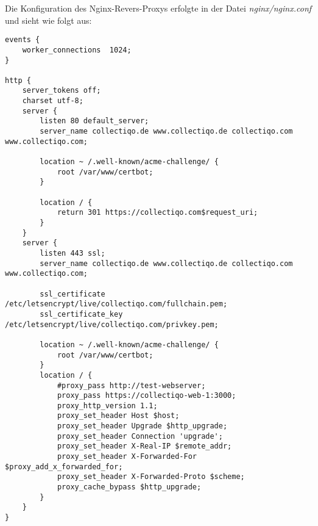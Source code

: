 Die Konfiguration des Nginx-Revers-Proxys erfolgte in der Datei \textit{nginx/nginx.conf} und sieht wie folgt aus:
\vspace{1em}
\begin{lstlisting}[label={lst:lst-nginx-config}]
events {
    worker_connections  1024;
}

http {
    server_tokens off;
    charset utf-8;
    server {
        listen 80 default_server;
        server_name collectiqo.de www.collectiqo.de collectiqo.com www.collectiqo.com;

        location ~ /.well-known/acme-challenge/ {
            root /var/www/certbot;
        }

        location / {
            return 301 https://collectiqo.com$request_uri;
        }
    }
    server {
        listen 443 ssl;
        server_name collectiqo.de www.collectiqo.de collectiqo.com www.collectiqo.com;

        ssl_certificate /etc/letsencrypt/live/collectiqo.com/fullchain.pem;
        ssl_certificate_key /etc/letsencrypt/live/collectiqo.com/privkey.pem;

        location ~ /.well-known/acme-challenge/ {
            root /var/www/certbot;
        }
        location / {
            #proxy_pass http://test-webserver;
            proxy_pass https://collectiqo-web-1:3000;
            proxy_http_version 1.1;
            proxy_set_header Host $host;
            proxy_set_header Upgrade $http_upgrade;
            proxy_set_header Connection 'upgrade';
            proxy_set_header X-Real-IP $remote_addr;
            proxy_set_header X-Forwarded-For $proxy_add_x_forwarded_for;
            proxy_set_header X-Forwarded-Proto $scheme;
            proxy_cache_bypass $http_upgrade;
        }
    }
}
\end{lstlisting}
\vspace{1em}
